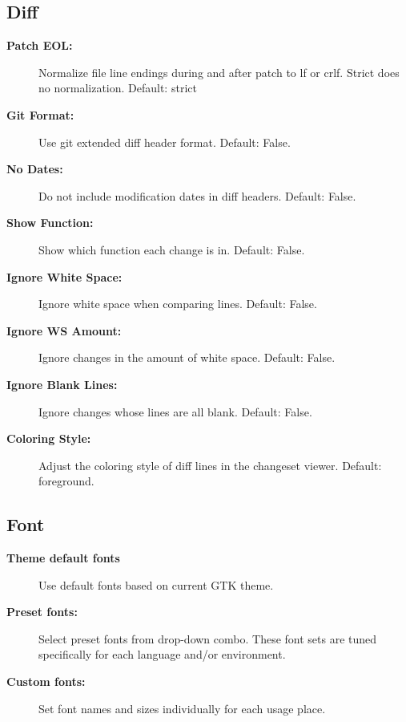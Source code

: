 \documentclass[letterpaper,10pt,english]{manual}
\begin{document}
\subsection{Diff}
\begin{description}
\item[\textbf{Patch EOL:}]
Normalize file line endings during and after patch to lf or crlf.
Strict does no normalization.  Default: strict

\item[\textbf{Git Format:}]
Use git extended diff header format.
Default: False.

\item[\textbf{No Dates:}]
Do not include modification dates in diff headers.
Default: False.

\item[\textbf{Show Function:}]
Show which function each change is in.
Default: False.

\item[\textbf{Ignore White Space:}]
Ignore white space when comparing lines.
Default: False.

\item[\textbf{Ignore WS Amount:}]
Ignore changes in the amount of white space.
Default: False.

\item[\textbf{Ignore Blank Lines:}]
Ignore changes whose lines are all blank.
Default: False.

\item[\textbf{Coloring Style:}]
Adjust the coloring style of diff lines in the changeset viewer.
Default: foreground.

\end{description}
\hypertarget{module-font.settings}{}

\subsection{Font}
\begin{description}
\item[\textbf{Theme default fonts}]
Use default fonts based on current GTK theme.

\item[\textbf{Preset fonts:}]
Select preset fonts from drop-down combo.  These font sets are tuned
specifically for each language and/or environment.

\item[\textbf{Custom fonts:}]
Set font names and sizes individually for each usage place.

\end{description}
\end{document}
